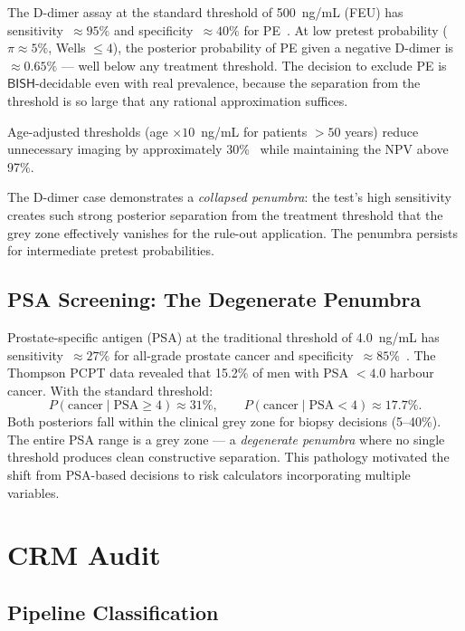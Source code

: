 \documentclass[11pt,a4paper]{article}
\theoremstyle{plain}
\theoremstyle{definition}
\newcommand{\BISH}{\textsf{BISH}}
\begin{document}
The D-dimer assay at the standard threshold of 500~ng/mL (FEU) has sensitivity~$\approx 95\%$ and specificity~$\approx 40\%$ for PE~\cite{dinisio2007}.  At low pretest probability ($\pi \approx 5\%$, Wells $\leq 4$), the posterior probability of PE given a negative D-dimer is $\approx 0.65\%$ --- well below any treatment threshold.  The decision to exclude PE is $\BISH$-decidable even with real prevalence, because the separation from the threshold is so large that any rational approximation suffices.

Age-adjusted thresholds (age $\times 10$~ng/mL for patients $> 50$ years) reduce unnecessary imaging by approximately 30\%~\cite{righini2014} while maintaining the NPV above 97\%.

The D-dimer case demonstrates a \emph{collapsed penumbra}: the test's high sensitivity creates such strong posterior separation from the treatment threshold that the grey zone effectively vanishes for the rule-out application.  The penumbra persists for intermediate pretest probabilities.

\subsection{PSA Screening: The Degenerate Penumbra}

Prostate-specific antigen (PSA) at the traditional threshold of 4.0~ng/mL has sensitivity~$\approx 27\%$ for all-grade prostate cancer and specificity~$\approx 85\%$~\cite{thompson2004}.  The Thompson PCPT data revealed that 15.2\% of men with PSA $< 4.0$ harbour cancer.  With the standard threshold:
\[
  P(\text{cancer} \mid \text{PSA} \geq 4) \approx 31\%, \qquad P(\text{cancer} \mid \text{PSA} < 4) \approx 17.7\%.
\]
Both posteriors fall within the clinical grey zone for biopsy decisions (5--40\%).  The entire PSA range is a grey zone --- a \emph{degenerate penumbra} where no single threshold produces clean constructive separation.  This pathology motivated the shift from PSA-based decisions to risk calculators incorporating multiple variables.

\section{CRM Audit}\label{sec:crm}

\subsection{Pipeline Classification}
\end{document}
